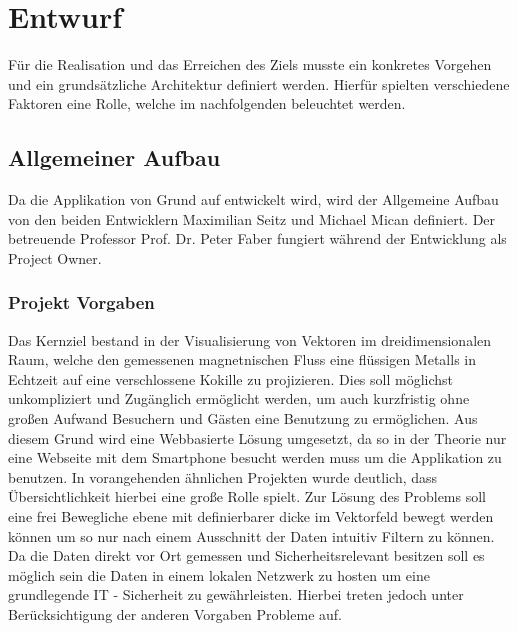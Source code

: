 \section{Entwurf}
Für die Realisation und das Erreichen des Ziels musste ein konkretes Vorgehen und ein grundsätzliche Architektur definiert werden. Hierfür spielten verschiedene Faktoren eine Rolle, welche im nachfolgenden beleuchtet werden.

\subsection{Allgemeiner Aufbau}
Da die Applikation von Grund auf entwickelt wird, wird der Allgemeine Aufbau von den beiden Entwicklern Maximilian Seitz und Michael Mican definiert. Der betreuende Professor Prof. Dr. Peter Faber fungiert während der Entwicklung als Project Owner.

\subsubsection{Projekt Vorgaben}
Das Kernziel bestand in der Visualisierung von Vektoren im dreidimensionalen Raum, welche den gemessenen magnetnischen Fluss eine flüssigen Metalls in Echtzeit auf eine verschlossene Kokille zu projizieren. Dies soll möglichst unkompliziert und Zugänglich ermöglicht werden, um auch kurzfristig ohne großen Aufwand Besuchern und Gästen eine Benutzung zu ermöglichen. Aus diesem Grund wird eine Webbasierte Lösung umgesetzt, da so in der Theorie nur eine Webseite mit dem Smartphone besucht werden muss um die Applikation zu benutzen. In vorangehenden ähnlichen Projekten wurde deutlich, dass Übersichtlichkeit hierbei eine große Rolle spielt. Zur Lösung des Problems soll eine frei Bewegliche ebene mit definierbarer dicke im Vektorfeld bewegt werden können um so nur nach einem Ausschnitt der Daten intuitiv Filtern zu können. Da die Daten direkt vor Ort gemessen und Sicherheitsrelevant besitzen soll es möglich sein die Daten in einem lokalen Netzwerk zu hosten um eine grundlegende IT - Sicherheit zu gewährleisten. Hierbei treten jedoch unter Berücksichtigung der anderen Vorgaben Probleme auf.


%	
%	


